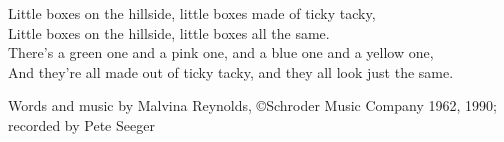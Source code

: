 
\epigraph{%
Little boxes on the hillside,
little boxes made of ticky tacky, \\
Little boxes on the hillside,
little boxes all the same. \\
There's a green one and a pink one,
and a blue one and a yellow one, \\
And they're all made out of ticky tacky,
and they all look just the same.
}
{Words and music by Malvina Reynolds, \copyright Schroder Music Company 1962, 1990; recorded by Pete Seeger}
